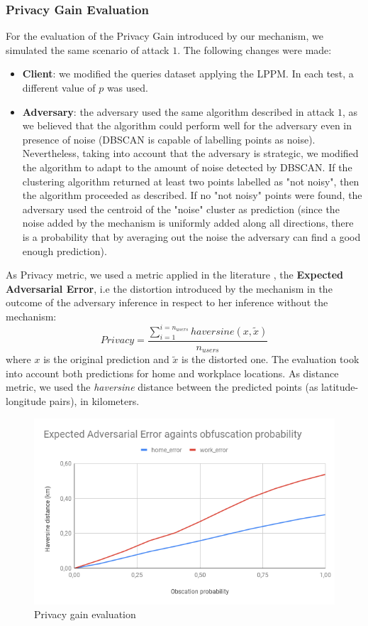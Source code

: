 \documentclass[10pt,conference,compsocconf]{IEEEtran}
\begin{document}
\subsubsection{Privacy Gain Evaluation}
For the evaluation of the Privacy Gain introduced by our mechanism, we simulated
the same scenario of attack $1$. The following changes were made:
\begin{itemize}
    \item \textbf{Client}: we modified the queries dataset applying the LPPM. In
    each test, a different value of $p$ was used.
    \item \textbf{Adversary}: the adversary used the same algorithm described in
    attack $1$, as we believed that the algorithm could perform well for the
    adversary even in presence of noise (DBSCAN is capable of labelling points
    as noise). Nevertheless, taking into account that the adversary is
    strategic, we modified the algorithm to adapt to the amount of noise
    detected by DBSCAN. If the clustering algorithm returned at least two points
    labelled as "not noisy", then the algorithm proceeded as described. If no
    "not noisy" points were found, the adversary used the centroid of the
    "noise" cluster as prediction (since the noise added by the mechanism is
    uniformly added along all directions, there is a probability that by
    averaging out the noise the adversary can find a good enough prediction).
\end{itemize}
As Privacy metric, we used a metric applied in the literature \cite{Shokri}, the
\textbf{Expected Adversarial Error}, i.e the distortion introduced by the
mechanism in the outcome of the adversary inference in respect to her inference
without the mechanism:
\[Privacy = \frac{\sum_{i=1}^{i=n_{users}}haversine(x, \tilde{x})}{n_{users}}\] where $x$ is the
original prediction and $\tilde{x}$ is the distorted one. The evaluation took
into account both predictions for home and workplace locations. As distance
metric, we used the \textit{haversine} distance between the predicted points (as
latitude-longitude pairs), in kilometers.
    \begin{figure}[h!]
        \centering
        \includegraphics[width=0.5\linewidth]{../privacy_evaluation/defence_evaluation/adv_error.png}
        \caption{Privacy gain evaluation}
    \end{figure}
\end{document}
